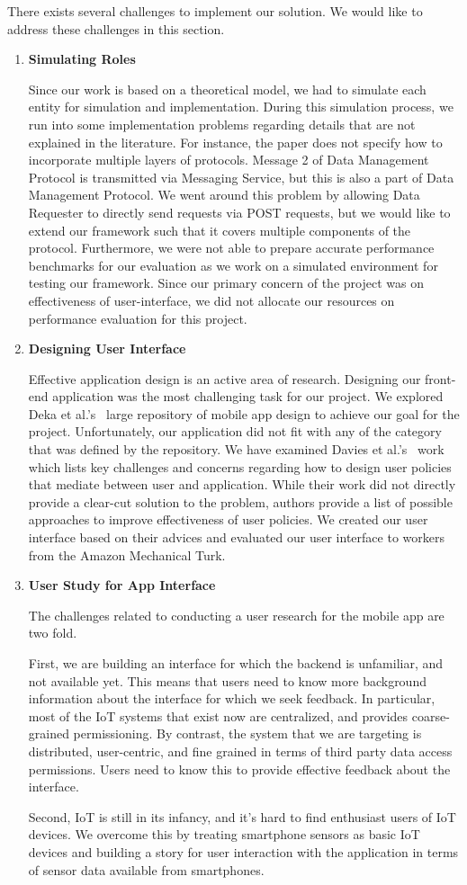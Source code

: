 There exists several challenges to implement our solution. We would like to address these challenges in this section. 

\begin{enumerate}
\item \textbf{Simulating Roles}

Since our work is based on a theoretical model, we had to simulate each entity for simulation and implementation. During this simulation process, we run into some implementation problems regarding details that are not explained in the literature. For instance, the paper does not specify how to incorporate multiple layers of protocols. Message 2 of Data Management Protocol is transmitted via Messaging Service, but this is also a part of Data Management Protocol. We went around this problem by allowing Data Requester to directly send requests via POST requests, but we would like to extend our framework such that it covers multiple components of the protocol. Furthermore, we were not able to prepare accurate performance benchmarks for our evaluation as we work on a simulated environment for testing our framework. Since our primary concern of the project was on effectiveness of user-interface, we did not allocate our resources on performance evaluation for this project.

\item \textbf{Designing User Interface}

Effective application design is an active area of research. Designing our front-end application was the most challenging task for our project. We explored Deka et al.'s~\cite{rico} large repository of mobile app design to achieve our goal for the project. Unfortunately, our application did not fit with any of the category that was defined by the repository. We have examined Davies et al.'s~\cite{davies} work which lists key challenges and concerns regarding how to design user policies that mediate between user and application. While their work did not directly provide a clear-cut solution to the problem, authors provide a list of possible approaches to improve effectiveness of user policies. We created our user interface based on their advices and evaluated our user interface to workers from the Amazon Mechanical Turk.

\item \textbf{User Study for App Interface}

The challenges related to conducting a user research for the mobile app are two fold.

First, we are building an interface for which the backend is unfamiliar, and not available yet. This means that users need to know more background information about the interface for which we seek feedback. In particular, most of the IoT systems that exist now are centralized, and provides coarse-grained permissioning. By contrast, the system that we are targeting is distributed, user-centric, and fine grained in terms of third party data access permissions. Users need to know this to provide effective feedback about the interface.

Second, IoT is still in its infancy, and it's hard to find enthusiast users of IoT devices. We overcome this by treating smartphone sensors as basic IoT devices and building a story for user interaction with the application in terms of sensor data available from smartphones.
\end{enumerate}
